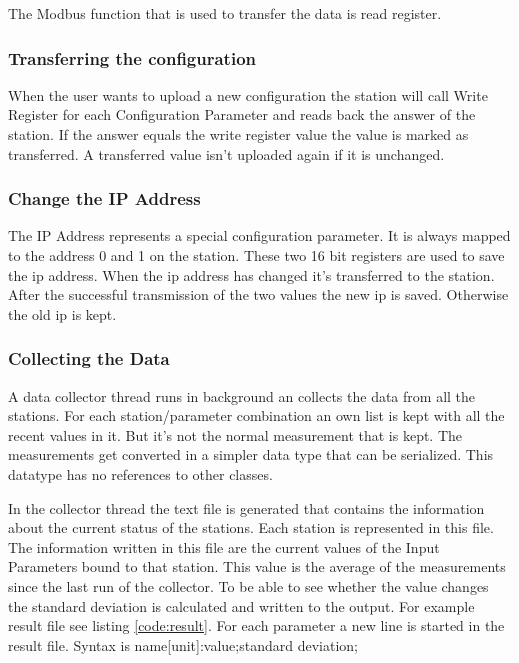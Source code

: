 The Modbus function that is used to transfer the data is read register.

\subsubsection{Transferring the configuration} %
\label{ssub:transferring_the_configuration}
When the user wants to upload a new configuration the station will call Write Register for each Configuration Parameter and reads back the answer of the station. If the answer equals the write register value the value is marked as transferred. A transferred value isn't uploaded again if it is unchanged.
\subsubsection{Change the IP Address} %
\label{ssub:change_the_ip_address}
The IP Address represents a special configuration parameter. It is always mapped to the address 0 and 1 on the station. These two 16 bit registers are used to save the ip address. When the ip address has changed it's transferred to the station. After the successful transmission of the two values the new ip is saved. Otherwise the old ip is kept.


\subsubsection{Collecting the Data} %
\label{ssub:collecting_the_data}
A data collector thread runs in background an collects the data from all the stations. For each station/parameter combination an own list is kept with all the recent values in it. But it's not the normal measurement that is kept. The measurements get converted in a simpler data type that can be serialized. This datatype has no references to other classes. 

In the collector thread the text file is generated that contains the information about the current status of the stations. Each station is represented in this file. The information written in this file are the current values of the Input Parameters bound to that station. This value is the average of the measurements since the last run of the collector. To be able to see whether the value changes the standard deviation is calculated and written to the output. For example result file see listing \ref{code:result}. 
For each parameter a new line is started in the result file. Syntax is {\C name[unit]:value;standard deviation;}

